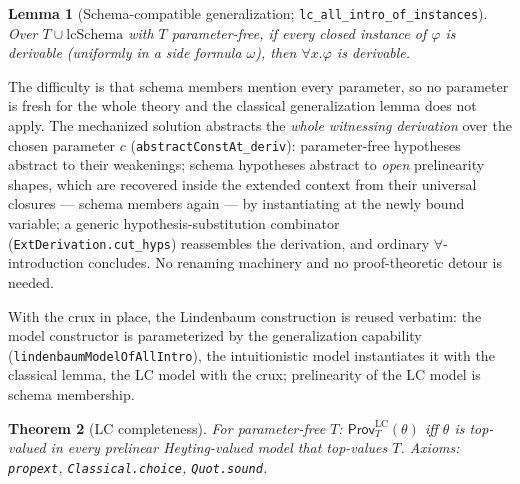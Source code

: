 \documentclass[11pt]{article}
\newcommand{\code}[1]{\texttt{#1}}
\newcommand{\ProvLC}{\mathsf{Prov}^{\mathrm{LC}}}
\theoremstyle{plain}
\newtheorem{theorem}{Theorem}[section]
\newtheorem{lemma}[theorem]{Lemma}
\theoremstyle{definition}
\begin{document}
\begin{lemma}[Schema-compatible generalization;
\code{lc\_all\_intro\_of\_instances}]
Over $T\cup\mathrm{lcSchema}$ with $T$ parameter-free, if every closed
instance of $\varphi$ is derivable (uniformly in a side formula $\omega$),
then $\forall x.\varphi$ is derivable.
\end{lemma}

The difficulty is that schema members mention every parameter, so no
parameter is fresh for the whole theory and the classical generalization
lemma does not apply.  The mechanized solution abstracts the \emph{whole
witnessing derivation} over the chosen parameter $c$
(\code{abstractConstAt\_deriv}): parameter-free hypotheses abstract to their
weakenings; schema hypotheses abstract to \emph{open} prelinearity shapes,
which are recovered inside the extended context from their universal closures
--- schema members again --- by instantiating at the newly bound variable;
a generic hypothesis-substitution combinator (\code{ExtDerivation.cut\_hyps})
reassembles the derivation, and ordinary $\forall$-introduction concludes.
No renaming machinery and no proof-theoretic detour is needed.

With the crux in place, the Lindenbaum construction is reused verbatim: the
model constructor is parameterized by the generalization capability
(\code{lindenbaumModelOfAllIntro}), the intuitionistic model instantiates it
with the classical lemma, the LC model with the crux; prelinearity of the LC
model is schema membership.

\begin{theorem}[LC completeness]
For parameter-free $T$:\;
$\ProvLC_T(\theta)$ iff $\theta$ is top-valued in every \emph{prelinear}
Heyting-valued model that top-values $T$.
Axioms: \code{propext}, \code{Classical.choice}, \code{Quot.sound}.
\end{theorem}
\end{document}
